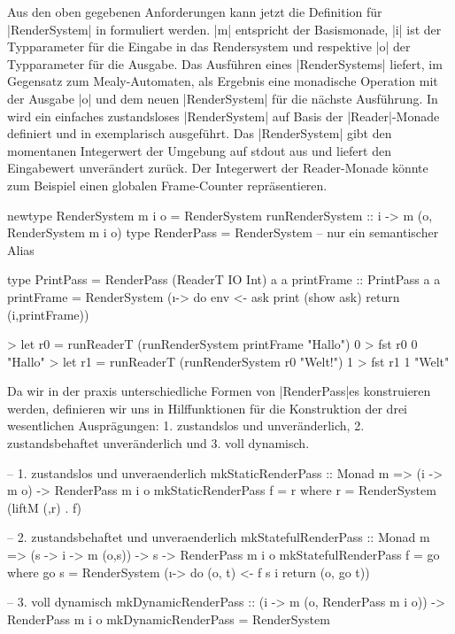 Aus den oben gegebenen Anforderungen kann jetzt die Definition für |RenderSystem| in  formuliert werden. |m| entspricht der Basismonade, |i| ist der Typparameter für die Eingabe in das Rendersystem und respektive |o| der Typparameter für die Ausgabe. Das Ausführen eines |RenderSystems| liefert, im Gegensatz zum Mealy-Automaten, als Ergebnis eine monadische Operation mit der Ausgabe |o| und dem neuen |RenderSystem| für die nächste Ausführung. In  wird ein einfaches zustandsloses |RenderSystem| auf Basis der |Reader|-Monade definiert und in  exemplarisch ausgeführt. Das |RenderSystem| gibt den momentanen Integerwert der Umgebung auf stdout aus und liefert den Eingabewert unverändert zurück. Der Integerwert der Reader-Monade könnte zum Beispiel einen globalen Frame-Counter repräsentieren.

\begin{haskell}[label={lst:definition-rendersystem},caption={Definition Rendersystem},float]
newtype RenderSystem m i o = RenderSystem { runRenderSystem :: i -> m (o, RenderSystem m i o) }
type RenderPass = RenderSystem -- nur ein semantischer Alias
\end{haskell}

\begin{haskell}[label={lst:rendersystem-beispiel-reader},caption={Beispiel Rendersystem mit ReaderT IO als Basismonade},float]
type PrintPass = RenderPass (ReaderT IO Int) a a
printFrame :: PrintPass a a
printFrame = RenderSystem (\i -> do
	env <- ask 
	print (show ask)
	return (i,printFrame))
\end{haskell}

\begin{haskell}[label={lst:rendersystem-ausfuehrung-beispiel},caption={Ausführungsbeispiel Rendersystem},float]
> let r0 = runReaderT (runRenderSystem printFrame "Hallo") 0
> fst r0
0
"Hallo"
> let r1 = runReaderT (runRenderSystem r0 "Welt!") 1
> fst r1
1
"Welt"
\end{haskell}

Da wir in der praxis unterschiedliche Formen von |RenderPass|es konstruieren werden, definieren wir uns in  Hilffunktionen für die Konstruktion der drei wesentlichen Ausprägungen: 1. zustandslos und unveränderlich, 2. zustandsbehaftet unveränderlich und 3. voll dynamisch.

\begin{haskell}[label={lst:renderpass-ctr},caption={Konstruktoren für einen RenderPass},float]
-- 1. zustandslos und unveraenderlich
mkStaticRenderPass :: Monad m => (i -> m o) -> RenderPass m i o
mkStaticRenderPass f = r where r = RenderSystem (liftM (,r) . f)

-- 2. zustandsbehaftet und unveraenderlich
mkStatefulRenderPass :: Monad m => (s -> i -> m (o,s)) -> s -> RenderPass m i o
mkStatefulRenderPass f = go where
  go s = RenderSystem (\i -> do
    (o, t) <- f s i
    return (o, go t))

-- 3. voll dynamisch
mkDynamicRenderPass :: (i -> m (o, RenderPass m i o)) -> RenderPass m i o
mkDynamicRenderPass = RenderSystem
\end{haskell}


